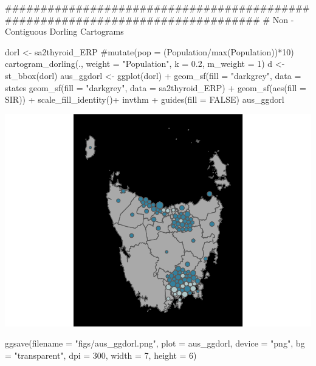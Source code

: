 \begin{Schunk}
\begin{Sinput}
###############################################################################
# Non - Contiguous Dorling Cartograms

dorl <- sa2thyroid_ERP %
  #mutate(pop = (Population/max(Population))*10) %
  cartogram_dorling(., weight = "Population", k = 0.2, m_weight = 1) %
d <- st_bbox(dorl)
aus_ggdorl <- ggplot(dorl) +
  geom_sf(fill = "darkgrey",  data = states %
  geom_sf(fill = "darkgrey",  data = sa2thyroid_ERP) + 
  geom_sf(aes(fill = SIR)) + 
  scale_fill_identity()+
  invthm + guides(fill = FALSE)
aus_ggdorl
\end{Sinput}

\includegraphics{kobakian-cook_files/figure-latex/unnamed-chunk-2-1} \begin{Sinput}
ggsave(filename = "figs/aus_ggdorl.png", plot = aus_ggdorl,
       device = "png", bg = "transparent", dpi = 300,  width = 7, height = 6)
\end{Sinput}
\end{Schunk}

